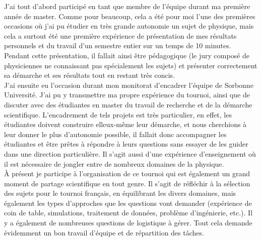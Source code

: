 \documentclass[a4paper,11pt]{article} %
\newcommand{\pointmedian}{\fontfamily{cmr}\selectfont\textperiodcentered}
\begin{document}
	J'ai tout d'abord participé en tant que membre de l'équipe durant ma première année de master. Comme pour beaucoup, cela a été pour moi l'une des premières occasions où j'ai pu étudier en très grande autonomie un sujet de physique, mais cela a surtout été une première expérience de présentation de mes résultats personnels et du travail d'un semestre entier sur un temps de 10 minutes. Pendant cette présentation, il fallait ainsi être pédagogique (le jury composé de physicien\pointmedian nes ne connaissant pas spécialement les sujets) et présenter correctement sa démarche et ses résultats tout en restant très concis.\\
	
	J'ai ensuite eu l'occasion durant mon monitorat d'encadrer l'équipe de Sorbonne Université. J'ai pu y transmettre ma propre expérience du tournoi, ainsi que de discuter avec des étudiant\pointmedian es en master du travail de recherche et de la démarche scientifique. L'encadrement de tels projets est très particulier, en effet, les étudiant\pointmedian es doivent construire elleux-même leur démarche, et nous cherchions à leur donner le plus d'autonomie possible, il fallait donc accompagner les étudiant\pointmedian es et être prêt\pointmedian es à répondre à leurs questions sans essayer de les guider dans une direction particulière. Il s'agit aussi d'une expérience d'enseignement où il est nécessaire de jongler entre de nombreux domaines de la physique.\\
	
	\`A présent je participe à l'organisation de ce tournoi qui est également un grand moment de partage scientifique en tout genre. Il s'agit de réfléchir à la sélection des sujets pour le tournoi français, en équilibrant les divers domaines, mais également les types d'approches que les questions vont demander (expérience de coin de table, simulations, traitement de données, problème d'ingénierie, etc.). Il y a également de nombreuses questions de logistique à gérer. Tout cela demande évidemment un bon travail d'équipe et de répartition des tâches. %
	
	
\end{document}
